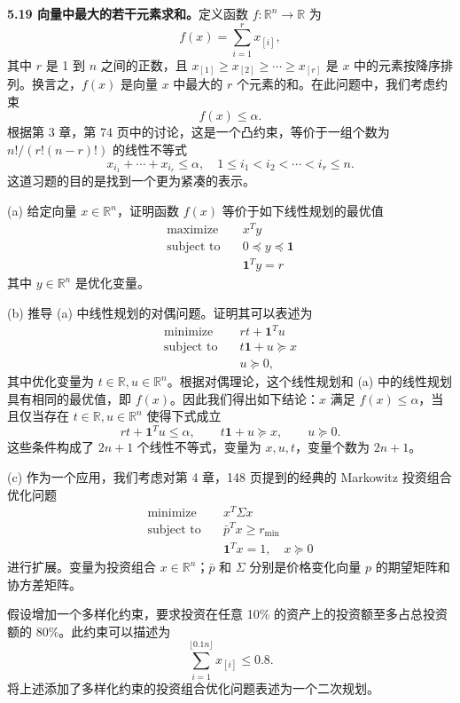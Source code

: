 \documentclass[UTF8, 12pt, fontset=fandol, oneside]{ctexart}
\begin{document}
\noindent\textbf{5.19 向量中最大的若干元素求和。}\quad 定义函数 $f:\mathbb{R}^n\to\mathbb{R}$ 为
\[
f(x)=\sum_{i=1}^r x_{[i]},
\]
其中 $r$ 是 1 到 $n$ 之间的正数，且 $x_{[1]}\geq x_{[2]}\geq\cdots\geq x_{[r]}$ 是 $x$ 中的元素按降序排列。换言之，$f(x)$ 是向量 $x$ 中最大的 $r$ 个元素的和。在此问题中，我们考虑约束
\[
f(x)\leq \alpha.
\]
根据第 3 章，第 74 页中的讨论，这是一个凸约束，等价于一组个数为 $n!/(r!(n-r)!)$ 的线性不等式
\[
x_{i_1}+\cdots+x_{i_r}\leq \alpha,\quad 1\leq i_1<i_2<\cdots<i_r\leq n.
\]
这道习题的目的是找到一个更为紧凑的表示。

(a) 给定向量 $x\in\mathbb{R}^n$，证明函数 $f(x)$ 等价于如下线性规划的最优值
\[
\begin{aligned}
\text{maximize}\quad & x^Ty\\
\text{subject to}\quad & 0\preceq y\preceq \mathbf{1}\\
& \mathbf{1}^Ty=r
\end{aligned}
\]
其中 $y\in\mathbb{R}^n$ 是优化变量。

(b) 推导 (a) 中线性规划的对偶问题。证明其可以表述为
\[
\begin{aligned}
\text{minimize}\quad & rt+\mathbf{1}^Tu\\
\text{subject to}\quad & t\mathbf{1}+u\succeq x\\
& u\succeq 0,
\end{aligned}
\]
其中优化变量为 $t\in\mathbb{R}, u\in\mathbb{R}^n$。根据对偶理论，这个线性规划和 (a) 中的线性规划具有相同的最优值，即 $f(x)$。因此我们得出如下结论：$x$ 满足 $f(x)\leq \alpha$，当且仅当存在 $t\in\mathbb{R}, u\in\mathbb{R}^n$ 使得下式成立
\[
rt+\mathbf{1}^Tu\leq \alpha,\qquad t\mathbf{1}+u\succeq x,\qquad u\succeq 0.
\]
这些条件构成了 $2n+1$ 个线性不等式，变量为 $x,u,t$，变量个数为 $2n+1$。

(c) 作为一个应用，我们考虑对第 4 章，148 页提到的经典的 Markowitz 投资组合优化问题
\[
\begin{aligned}
\text{minimize}\quad & x^T\Sigma x\\
\text{subject to}\quad & \bar{p}^Tx\geq r_{\min}\\
& \mathbf{1}^Tx=1,\quad x\succeq 0
\end{aligned}
\]
进行扩展。变量为投资组合 $x\in\mathbb{R}^n$；$\bar{p}$ 和 $\Sigma$ 分别是价格变化向量 $p$ 的期望矩阵和协方差矩阵。

假设增加一个多样化约束，要求投资在任意 10\% 的资产上的投资额至多占总投资额的 80\%。此约束可以描述为
\[
\sum_{i=1}^{\lfloor 0.1n\rfloor}x_{[i]}\leq 0.8.
\]
将上述添加了多样化约束的投资组合优化问题表述为一个二次规划。
\end{document}
